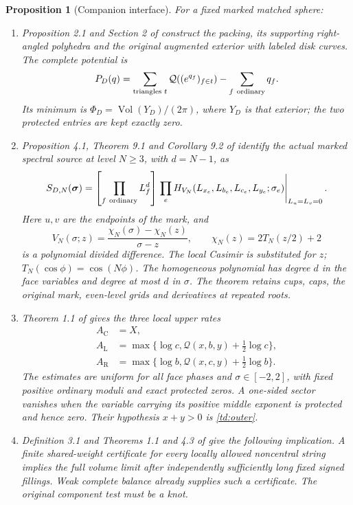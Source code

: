 \documentclass[11pt]{article}
\numberwithin{equation}{section}
\newtheorem{proposition}[theorem]{Proposition}
\theoremstyle{definition}
\newcommand{\Vol}{\operatorname{Vol}}
\newcommand{\Cen}{\mathrm C}
\newcommand{\Lft}{\mathrm L}
\newcommand{\Rgt}{\mathrm R}
\newcommand{\calQ}{\mathcal Q}
\begin{document}
\begin{proposition}[Companion interface]\label{td:imports}
For a fixed marked matched sphere:
\begin{enumerate}[label=\textup{(\roman*)},leftmargin=*]
\item Proposition 2.1 and Section 2 of \cite{Marked} construct the
packing, its supporting right-angled polyhedra and the original
augmented exterior with labeled disk curves. The complete
potential is
\[
 P_D(q)=\sum_{\text{triangles }t}\calQ((e^{q_f})_{f\in t})
                    -\sum_{f\ {\rm ordinary}}q_f .
\]
Its minimum is
\(\Phi_D=\Vol(Y_D)/(2\pi)\), where \(Y_D\) is that exterior;
the two protected entries are kept exactly zero.
\item Proposition 4.1, Theorem 9.1 and Corollary 9.2 of
\cite{Finite} identify the actual marked spectral source at
level \(N\ge3\), with \(d=N-1\), as
\begin{equation}\label{td:source}
 S_{D,N}(\boldsymbol\sigma)=
 \left[\prod_{f\ {\rm ordinary}} L_f^d\right]
 \left.\prod_e H_{V_N}(L_{x_e},L_{b_e},L_{c_e},L_{y_e};\sigma_e)
                                      \right|_{L_u=L_v=0}.
\end{equation}
Here \(u,v\) are the endpoints of the mark, and
\[
 V_N(\sigma;z)=
 \frac{\chi_N(\sigma)-\chi_N(z)}{\sigma-z},\qquad
 \chi_N(z)=2T_N(z/2)+2
\]
is a polynomial divided difference. The local Casimir is substituted
for \(z\); \(T_N(\cos\phi)=\cos(N\phi)\).
The homogeneous polynomial has degree \(d\) in the face variables
and degree at most \(d\) in \(\sigma\). The theorem retains cups,
caps, the original mark, even-level grids and derivatives at repeated roots.
\item Theorem 1.1 of \cite{CasimirSources} gives the three local upper rates
\begin{equation}\label{td:rates}
 \begin{aligned}
 A_{\Cen}&=X,\\
 A_{\Lft}&=\max\{\log c,\calQ(x,b,y)+\tfrac12\log c\},\\
 A_{\Rgt}&=\max\{\log b,\calQ(x,c,y)+\tfrac12\log b\}.
 \end{aligned}
\end{equation}
The estimates are uniform for all face phases and
\(\sigma\in[-2,2]\), with fixed positive ordinary moduli and exact
protected zeros. A one-sided sector vanishes when the variable carrying its positive middle exponent is protected and hence zero. Their hypothesis \(x+y>0\) is \eqref{td:outer}.
\item Definition 3.1 and Theorems 1.1 and 4.3 of \cite{Planar}
give the following implication. A finite shared-weight certificate
for every locally allowed noncentral string implies the full
volume limit after independently sufficiently long fixed signed
fillings. Weak complete balance already supplies such a certificate.
The original component test must be a knot.
\end{enumerate}
\end{proposition}
\end{document}

